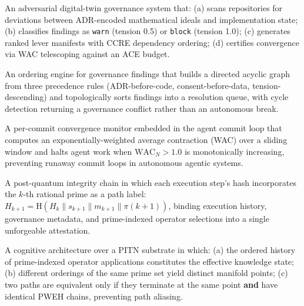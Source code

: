 \documentclass[12pt,a4paper]{article}
\theoremstyle{definition}
\theoremstyle{plain}
\theoremstyle{remark}
\begin{document}
\begin{claimbox}[title={Claim 3 --- Phase Mirror Dissonance (PMD) Framework}]
An adversarial digital-twin governance system that: (a) scans repositories for
deviations between ADR-encoded mathematical ideals and implementation state;
(b) classifies findings as \texttt{warn} (tension 0.5) or \texttt{block}
(tension 1.0); (c) generates ranked lever manifests with CCRE dependency
ordering; (d) certifies convergence via WAC telescoping against an ACE budget.
\end{claimbox}

\begin{claimbox}[title={Claim 4 --- Convergent Causal Resolution Engine (CCRE)}]
An ordering engine for governance findings that builds a directed acyclic graph
from three precedence rules (ADR-before-code, consent-before-data,
tension-descending) and topologically sorts findings into a resolution queue,
with cycle detection returning a governance conflict rather than an autonomous
break.
\end{claimbox}

\begin{claimbox}[title={Claim 5 --- Phase-Weighted Contractivity Feedback Loop (PWCFL)}]
A per-commit convergence monitor embedded in the agent commit loop that
computes an exponentially-weighted average contraction (WAC) over a sliding
window and halts agent work when $\mathrm{WAC}_N > 1.0$ is monotonically
increasing, preventing runaway commit loops in autonomous agentic systems.
\end{claimbox}
\newpage
\begin{claimbox}[title={Claim 6 --- Prime-Weighted Execution Hashing (PWEH)}]
A post-quantum integrity chain in which each execution step's hash incorporates
the $k$-th rational prime as a path label:
$H_{k+1} = \mathrm{H}(H_k \| s_{k+1} \| m_{k+1} \| \pi(k+1))$,
binding execution history, governance metadata, and prime-indexed operator
selections into a single unforgeable attestation.
\end{claimbox}

\begin{claimbox}[title={Claim 7 --- Non-Associative Fractal Learning (NAFL)}]
A cognitive architecture over a PITN substrate in which: (a) the ordered
history of prime-indexed operator applications constitutes the effective
knowledge state; (b) different orderings of the same prime set yield distinct
manifold points; (c) two paths are equivalent only if they terminate at the
same point \textbf{and} have identical PWEH chains, preventing path aliasing.
\end{claimbox}
\end{document}
